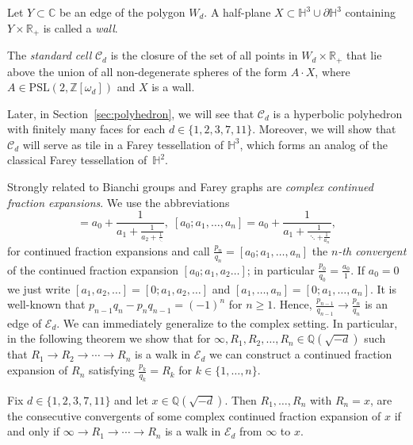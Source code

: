 \documentclass[graybox]{svmult}
\begin{document}
\begin{definition}\label{def:standard}
Let $Y\subset \mathbb{C}$ be an edge of the polygon $W_d$. A half-plane $X\subset \mathbb{H}^3 \cup \partial \mathbb{H}^3$ containing $Y \times \mathbb{R}_+$  is called a \emph{wall}.

The \emph{standard cell} $\mathcal{C}_d$ is the closure of the set of all points in $W_d\times \mathbb{R}_+$ that lie above the union of all non-degenerate spheres of the form $A \cdot X$, where $A\in \mathrm{PSL}(2,\mathbb{Z}[\omega_d])$ and $X$ is a wall.
\end{definition}

Later, in Section~\ref{sec:polyhedron}, we will see that $\mathcal{C}_d$ is a hyperbolic polyhedron with finitely many faces for each $d\in\{1,2,3,7,11\}$. Moreover, we will show that $\mathcal{C}_d$ will serve as tile in a Farey tessellation of $\mathbb{H}^3$, which forms an analog of the classical Farey tessellation of~$\mathbb{H}^2$.
  

Strongly related to Bianchi groups and Farey graphs are {\em complex continued fraction expansions}. We use the abbreviations 
\begin{equation*} 
[a_0; a_1,a_2\ldots]=
\displaystyle  a_0+\frac1{a_1+ 
 \displaystyle  \frac1{a_2 + 
 \displaystyle \frac1{\ddots }}}, 
 \;
 [a_0; a_1,\ldots,a_n]=\displaystyle  a_0+\frac1{a_1+ 
 \displaystyle \frac1{\ddots + 
 \displaystyle \frac1{a_n}}}, 
\end{equation*}
for continued fraction expansions and call $\frac{p_n}{q_n} = [a_0; a_1,\ldots,a_n]$ the {\em $n$-th convergent} of the continued fraction expansion $[a_0; a_1,a_2\ldots]$; in particular $\tfrac{p_{0}}{q_{0}} = \tfrac{a_{0}}{1}$. If $a_0=0$ we just write $[a_1,a_2,\ldots]=[0;a_1,a_2,\ldots]$ and $[a_1,\ldots,a_n]=[0;a_1,\ldots,a_n]$. 
It is well-known that $p_{n-1}q_{n}- p_{n}q_{n-1} = (-1)^{n}$ for $n \ge 1$.  Hence, $\tfrac{p_{n-1}}{q_{n-1}} \to  \tfrac{p_{n}}{q_{n}}$ is an edge of $\mathcal E_{d}$.  We can immediately generalize \cite[Theorem~3.1]{B-H-S} to the complex setting. In particular, in the following theorem we show that for  $\infty, R_{1}, R_{2},  \ldots, R_{n} \in \mathbb Q(\sqrt{-d})$ such that $R_{1}\to R_{2}\to  \cdots \to R_{n}$ is a walk in $\mathcal E_{d}$ we can construct a continued fraction expansion of $R_{n}$ satisfying $\frac{p_k}{q_k}=R_k$ for $k\in\{1,\ldots,n\}$.

\begin{theorem}\label{th:correspondencePathCF}
Fix $d\in\{1,2,3,7,11\}$ and let $x\in \mathbb{Q}(\sqrt{-d})$. Then $R_1,\ldots, R_n$ with $R_n=x$, are the consecutive convergents of some complex continued fraction expansion of $x$ if and only if $\infty \to  R_1 \to \cdots \to  R_n$ is a walk in $\mathcal{E}_{d}$ from 
$\infty$ to $x$.
\end{theorem}
\end{document}
